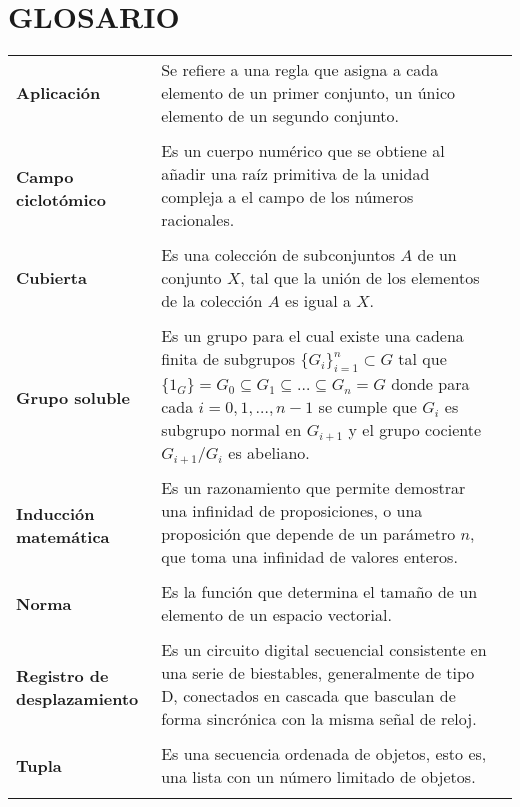 \chapter{GLOSARIO}
\vspace{.5cm}
\begin{flushleft}
\renewcommand{\arraystretch}{1} %
\begin{longtable}{@{}l@{\extracolsep{1.6cm}}  p{4.0in}@{} l@{}}
\textbf{Aplicación} & Se refiere a una regla que asigna a cada elemento de un primer conjunto, un único elemento de un segundo conjunto. \\
&\\
\multirow{2}{3cm}{\textbf{Campo ciclotómico}} & Es un cuerpo numérico que se obtiene al añadir una raíz primitiva de la unidad compleja a el campo de los números racionales.\\
&\\
\textbf{Cubierta} & Es una colección de subconjuntos $A$ de un conjunto $X$, tal que la unión de los elementos de la colección $A$ es igual a $X$. \\
&\\
\multirow{2}{2cm}{\textbf{Grupo soluble}} & Es un grupo para el cual existe una cadena finita de subgrupos $\{G_i\}_{i=1}^{n}\subset G$ tal que
 $\{1_G\}=G_0\subseteq G_1 \subseteq \dots \subseteq G_n = G$ donde para cada $i=0,1,\dots,n-1$ se cumple que $G_i$  es subgrupo normal en $G_{i+1}$ y
 el grupo cociente  $G_{i+1}/G_i$  es abeliano.\\
&\\
\multirow{2}{3cm}{\textbf{Inducción matemática}} & Es un razonamiento que permite demostrar una infinidad de proposiciones, o una proposición que depende de un parámetro $n$, que toma una infinidad de valores enteros.\\
&\\
\textbf{Norma} & Es la función que determina el tamaño de un elemento de un espacio vectorial.\\
&\\
\multirow{2}{3.5cm}{\textbf{Registro de desplazamiento}} &  Es un circuito digital secuencial consistente en una serie de biestables, generalmente de tipo D, conectados en cascada que basculan de forma sincrónica con la misma señal de reloj.\\
&\\
\textbf{Tupla} & Es una secuencia ordenada de objetos, esto es, una lista con un número limitado de objetos.\\
&\\
\end{longtable}
\end{flushleft}



